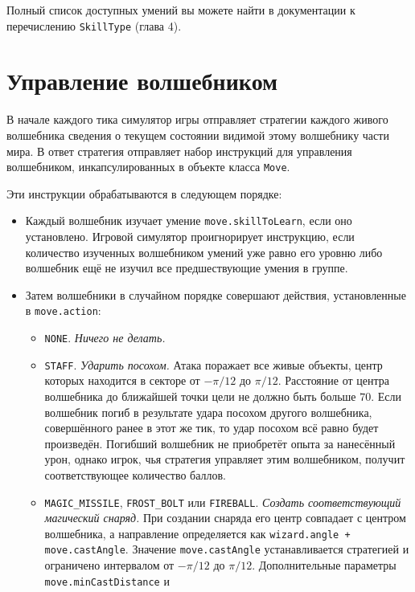 Полный список доступных умений вы можете найти в документации к перечислению \texttt{SkillType} (глава 4).

\section{Управление волшебником}

В начале каждого тика симулятор игры отправляет стратегии каждого живого волшебника сведения о текущем состоянии видимой этому волшебнику
части мира. В ответ стратегия отправляет набор инструкций для управления волшебником, инкапсулированных в объекте класса \texttt{Move}.

Эти инструкции обрабатываются в следующем порядке:
\begin{itemize}
    \item Каждый волшебник изучает умение \texttt{move.skillToLearn}, если оно установлено. Игровой симулятор проигнорирует инструкцию,
          если количество изученных волшебником умений уже равно его уровню либо волшебник ещё не изучил все предшествующие умения в группе.
    \item Затем волшебники в случайном порядке совершают действия, установленные в \texttt{move.action}:
          \begin{itemize}
              \item \texttt{NONE}. \textit{Ничего не делать.}
              \item \texttt{STAFF}. \textit{Ударить посохом.} Атака поражает все живые объекты, центр которых находится в секторе от
                    $-\pi / 12$ до $\pi / 12$. Расстояние от центра волшебника до ближайшей точки цели не должно быть больше $70$. Если
                    волшебник погиб в результате удара посохом другого волшебника, совершённого ранее в этот же тик, то удар посохом всё
                    равно будет произведён. Погибший волшебник не приобретёт опыта за нанесённый урон, однако игрок, чья стратегия управляет
                    этим волшебником, получит соответствующее количество баллов.
              \item \texttt{MAGIC\_MISSILE}, \texttt{FROST\_BOLT} или \texttt{FIREBALL}. \textit{Создать соответствующий магический снаряд.}
                    При создании снаряда его центр совпадает с центром волшебника, а направление определяется как
                    \texttt{wizard.angle + move.castAngle}. Значение \texttt{move.castAngle} устанавливается стратегией и ограничено
                    интервалом от $-\pi / 12$ до $\pi / 12$. Дополнительные параметры \texttt{move.minCastDistance} и

\end{itemize}
\end{itemize}
